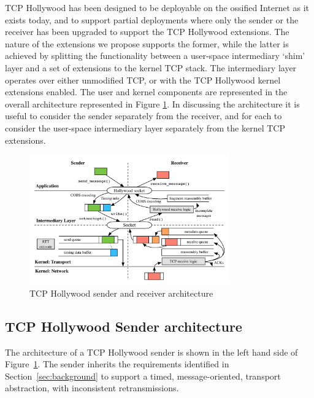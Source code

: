 


TCP Hollywood has been designed to be deployable on the ossified Internet
as it exists today, and to support partial deployments where only the sender
or the receiver has been upgraded to support the TCP Hollywood extensions.
The nature of the extensions we propose supports the former, while the
latter is achieved by splitting the functionality between a user-space
intermediary `shim' layer and a set of extensions to the kernel TCP stack.
The intermediary layer operates over either unmodified TCP, or with the
TCP Hollywood kernel extensions enabled. The user and kernel components
are represented in the overall architecture represented in Figure
\ref{diagram:architecture}. In discussing the architecture it is useful to
consider the sender separately from the receiver, and for each to consider
the user-space intermediary layer separately from the kernel TCP extensions.

\begin{figure}[t]
	\centering
	\includegraphics[width=\columnwidth,height=2.2in]{figures/message-flow-combined.pdf}
	\caption{TCP Hollywood sender and receiver architecture}
	\label{diagram:architecture}
\end{figure}

\subsection{TCP Hollywood Sender architecture}
\label{subsec:sender}

The architecture of a TCP Hollywood sender is shown in the left hand side
of Figure~\ref{diagram:architecture}. The sender inherits the requirements
identified in Section~\ref{sec:background} to support a timed,
message-oriented, transport abstraction, with inconsistent retransmissions.

